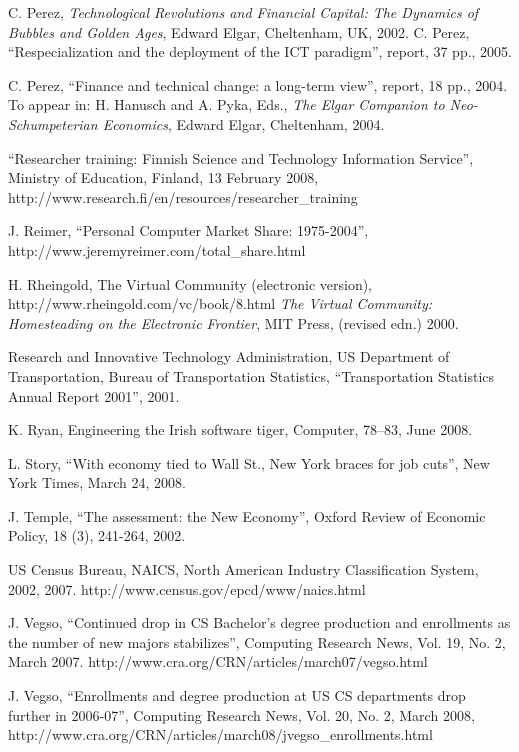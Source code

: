 \documentclass{article}
\begin{document}
\begin{thebibliography}{99.}
C. Perez, {\em Technological Revolutions and Financial Capital: The 
Dynamics of Bubbles and Golden Ages}, Edward Elgar, Cheltenham, UK,
2002. 
C. Perez, ``Respecialization and the deployment of the ICT paradigm'',
report, 37 pp., 2005.

C. Perez, ``Finance and technical change: a long-term view'', report,
18 pp., 2004.  To appear in: H. Hanusch and A. Pyka, Eds., {\em The Elgar
Companion to Neo-Schumpeterian Economics}, Edward Elgar, Cheltenham, 
2004.  

``Researcher training: Finnish Science and Technology Information Service'', 
Ministry of Education, Finland, 13 February 2008, 
http://www.research.fi/en/resources/researcher\_training

J. Reimer, ``Personal Computer Market Share: 1975-2004'', \\
http://www.jeremyreimer.com/total\_share.html

H. Rheingold, The Virtual Community (electronic version),
http://www.rheingold.com/vc/book/8.html
{\em The Virtual Community: Homesteading on the Electronic Frontier},  
MIT Press, (revised edn.) 2000. 

Research and Innovative Technology Administration, US Department of 
Transportation, Bureau of Transportation Statistics, ``Transportation 
Statistics Annual Report 2001'', 2001.  

K. Ryan, Engineering the Irish software tiger, Computer, 78--83,
June 2008.  

L. Story, ``With economy tied to Wall St., New York braces for job 
cuts'', New York Times, March 24, 2008.  





J. Temple, ``The assessment: the New Economy'', Oxford Review of Economic
Policy, 18 (3), 241-264, 2002.


US Census Bureau, NAICS, North American Industry Classification System, 
2002, 2007.  http://www.census.gov/epcd/www/naics.html

J. Vegso, ``Continued drop in CS Bachelor's degree production and enrollments 
as the number of new majors stabilizes'', 
Computing Research News, Vol. 19,
No. 2, March 2007. 
http://www.cra.org/CRN/articles/march07/vegso.html

J. Vegso, ``Enrollments and degree production at US CS 
departments drop further in 
2006-07'', Computing Research News, Vol. 20, No. 2, March 2008, 
http://www.cra.org/CRN/articles/march08/jvegso\_enrollments.html


\end{thebibliography}
\end{document}
